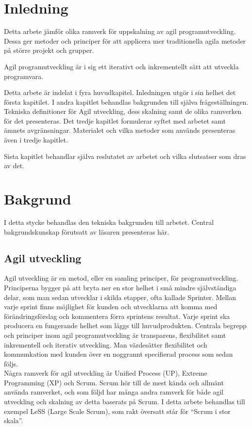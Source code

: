 \section{Inledning}
	
	Detta arbete jämför olika ramverk för uppskalning av agil programutveckling. Dessa ger metoder och principer för att applicera mer traditionella agila metoder på större projekt och grupper.
	
	Agil programutveckling är i sig ett iterativt och inkrementellt sätt att utveckla programvara.
	
	Detta arbete är indelat i fyra huvudkapitel. Inledningen utgör i sin helhet det första kapitilet.
	I andra kapitlet behandlas bakgrunden till själva frågeställningen. Tekniska definitioner för Agil utveckling, dess skalning samt de olika ramverken för det presenteras. 
	Det tredje kapitlet formulerar syftet med arbetet samt ämnets avgränsningar. Materialet och vilka metoder som används presenteras även i tredje kapitlet.
	
	Sista kapitlet behandlar själva reslutatet av arbetet och vilka slutsatser som dras av det.
	
\newpage
\section{Bakgrund} 	
	
	
	I detta stycke behandlas den tekniska bakgrunden till arbetet. Central bakgrundskunskap förutsatt av läsaren presenteras här.
	
	\subsection{Agil utveckling}
	
		Agil utveckling är en metod, eller en samling principer, för programutveckling. Principerna bygger på att bryta ner en stor helhet i små mindre självständiga delar, som man sedan utvecklar i skilda etapper, ofta kallade Sprinter.
		Mellan varje sprint finns möjlighet för kunden och utvecklarna att komma med förändringsförslag och kommentera förra sprintens resultat. Varje sprint ska producera en fungerande helhet som läggs till huvudprodukten. Centrala begrepp och principer inom agil programutveckling är transparens, flexibilitet samt inkrementell och iterativ utveckling. Man värdesätter flexibilitet och kommunkation med kunden över en noggrannt specifierad process som sedan följs. \cite{agile_manifesto}
		\\
		Några ramverk för agil utveckling är Unified Process (UP), Extreme Programming (XP) och Scrum.
		Scrum hör till de mest kända och allmänt använda ramverket, och som följd har många andra ramverk för både agil utveckling och skalning av detta baserats på Scrum. I detta arbete behandlas till exempel LeSS (Large Scale Scrum), som rakt översatt står för ``Scrum i stor skala''.
		
